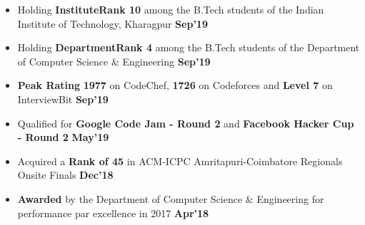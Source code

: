 \documentclass[10pt]{article}
\begin{document}
\vspace{-2ex}
\spacedhrule{0.15ex}{1.0ex}
\begin{itemize}[leftmargin=*]
\item Holding \textbf{InstituteRank 10} among the B.Tech students of the Indian Institute of Technology, Kharagpur {\hfill}\textbf{Sep'19}\\[-1.8em]
\item Holding \textbf{DepartmentRank 4} among the B.Tech students of the Department of Computer Science \& Engineering {\hfill}\textbf{Sep'19}\\[-1.8em]
\item \textbf{Peak Rating} \textbf{1977} on CodeChef, \textbf{1726} on Codeforces and \textbf{Level 7} on InterviewBit \href{https://github.com/shmundhra/Credentials/tree/master/Competitive\%20Programming/Online\%20Judges\%20Profiles} {\hspace{0.5ex}\footnotesize\faMousePointer} {\hfill}\textbf{Sep'19}\\[-1.8em]
\item Qualified for \textbf{Google Code Jam - Round 2} and \textbf{Facebook Hacker Cup - Round 2} \href{https://github.com/shmundhra/Credentials/tree/master/Competitive\%20Programming/Google\%20CodeJam} {\hspace{1ex}\footnotesize\faMousePointer} \href{https://github.com/shmundhra/Credentials/tree/master/Competitive\%20Programming/Facebook\%20Hacker\%20Cup} {\hspace{0.5ex}\footnotesize\faMousePointer} {\hfill}\textbf{May'19}\\[-1.8em]
\item Acquired a \textbf{Rank of 45} in ACM-ICPC Amritapuri-Coimbatore Regionals Onsite Finals \href{https://github.com/shmundhra/Credentials/tree/master/Competitive\%20Programming/ACM\%20ICPC\%202018} {\hspace{0.5ex}\footnotesize\faMousePointer} {\hfill}\textbf{Dec'18}\\[-1.8em]
\item \textbf{Awarded} by the Department of Computer Science \& Engineering for performance par excellence in 2017 \href{https://github.com/shmundhra/Credentials/tree/master/Scholarships} {\hspace{0.5ex}\footnotesize\faMousePointer} {\hfill}\textbf{Apr'18}\\[-1.8em]

\end{itemize}
\end{document}
